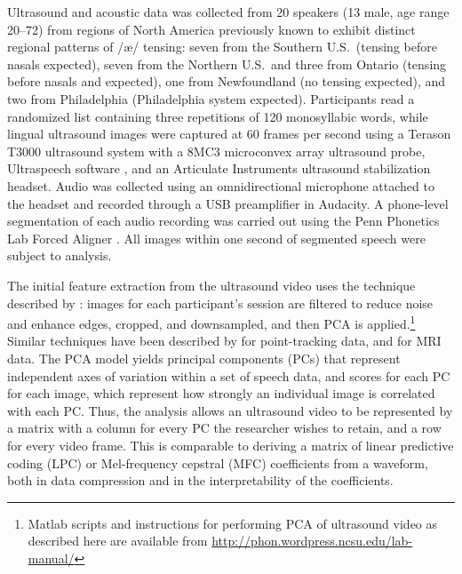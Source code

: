 \documentclass[output=paper]{LSP/langsci}
\begin{document}
Ultrasound and acoustic data was collected from 20 speakers (13 male, age range 20--72) from regions of North America previously known to exhibit distinct regional patterns of /æ/ tensing: seven from the Southern U.S.~(tensing before nasals expected), seven from the Northern U.S.~and three from Ontario (tensing before nasals and  expected), one from Newfoundland (no tensing expected), and two from Philadelphia (Philadelphia system expected). Participants read a randomized list containing three repetitions of 120 monosyllabic words, while lingual ultrasound images were captured at 60 frames per second using a Terason T3000 ultrasound system with a 8MC3 microconvex array ultrasound probe, Ultraspeech software \citep{hueber_eigentongue_2007}, and an Articulate Instruments ultrasound stabilization headset.  Audio was collected using an omnidirectional microphone attached to the headset and recorded through a USB preamplifier in Audacity. A phone-level segmentation of each audio recording was carried out using the Penn Phonetics Lab Forced Aligner \citep{yuan_speaker_2008}. All images within one second of segmented speech were subject to analysis.

The initial feature extraction from the ultrasound video uses the technique described by \citet{hueber_eigentongue_2007}: images for each participant's session are filtered to reduce noise and enhance edges, cropped, and downsampled, and then PCA is applied.\footnote{Matlab scripts and instructions for performing PCA of ultrasound video as described here are available from \href{http://phon.wordpress.ncsu.edu/lab-manual/}{http://phon.wordpress.ncsu.edu/lab-manual/}}  Similar techniques have been described by \citet{story_time_2007} for point-tracking data, and \citet{carignan_real-time_2015} for MRI data.  The PCA model yields principal components (PCs) that represent independent axes of variation within a set of speech data, and scores for each PC for each image, which represent how strongly an individual image is correlated with each PC. Thus, the analysis allows an ultrasound video to be represented by a matrix with a column for every PC the researcher wishes to retain, and a row for every video frame.  This is comparable to deriving a matrix of linear predictive coding (LPC) or Mel-frequency cepstral (MFC) coefficients from a waveform, both in data compression and in the interpretability of the coefficients. 
\end{document}
